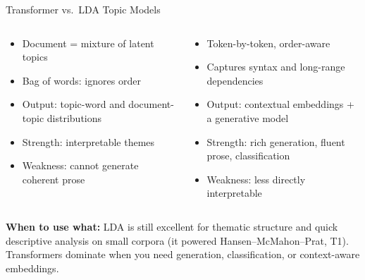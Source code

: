 \begin{frame}{Transformer vs.\ LDA Topic Models}
\begin{columns}[T]
\begin{tcolorbox}[colback=blue!5, colframe=blue!50!black, title=\textbf{LDA / topic models}]
\begin{itemize}
\item Document = mixture of latent topics
\item Bag of words: ignores order
\item Output: topic-word and document-topic distributions
\item Strength: interpretable themes
\item Weakness: cannot generate coherent prose
\end{itemize}
\end{tcolorbox}

\begin{tcolorbox}[colback=green!5, colframe=green!40!black, title=\textbf{Transformers}]
\begin{itemize}
\item Token-by-token, order-aware
\item Captures syntax and long-range dependencies
\item Output: contextual embeddings + a generative model
\item Strength: rich generation, fluent prose, classification
\item Weakness: less directly interpretable
\end{itemize}
\end{tcolorbox}
\end{columns}

\medskip
\textbf{When to use what:} LDA is still excellent for thematic structure and quick descriptive analysis on small corpora (it powered Hansen--McMahon--Prat, T1). Transformers dominate when you need generation, classification, or context-aware embeddings.
\end{frame}

